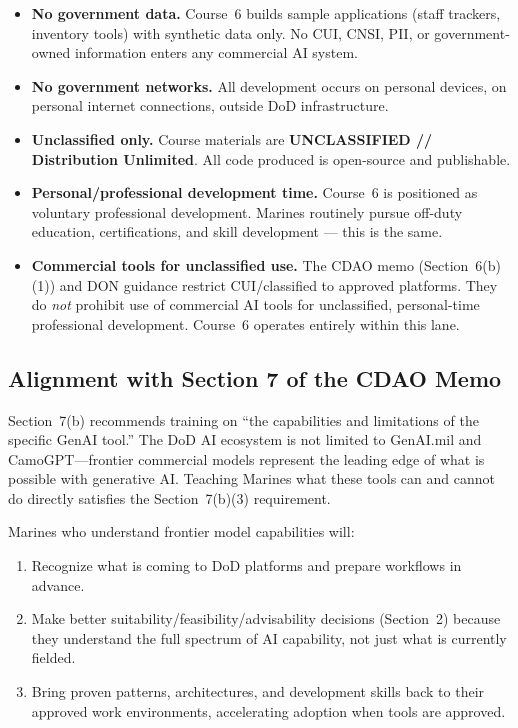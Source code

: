 \documentclass[11pt,letterpaper]{article}
\begin{document}
\begin{itemize}
  \item \textbf{No government data.} Course~6 builds sample applications (staff trackers, inventory tools) with synthetic data only.
  No CUI, CNSI, PII, or government-owned information enters any commercial AI system.
  \item \textbf{No government networks.} All development occurs on personal devices, on personal internet connections, outside DoD infrastructure.
  \item \textbf{Unclassified only.} Course materials are \textbf{UNCLASSIFIED // Distribution Unlimited}.
  All code produced is open-source and publishable.
  \item \textbf{Personal/professional development time.} Course~6 is positioned as voluntary professional development.
  Marines routinely pursue off-duty education, certifications, and skill development --- this is the same.
  \item \textbf{Commercial tools for unclassified use.} The CDAO memo (Section~6(b)(1)) and DON guidance restrict CUI/classified to approved platforms.
  They do \emph{not} prohibit use of commercial AI tools for unclassified, personal-time professional development.
  Course~6 operates entirely within this lane.
\end{itemize}

\subsection{Alignment with Section 7 of the CDAO Memo}

Section~7(b) recommends training on ``the capabilities and limitations of the specific GenAI tool.''
The DoD AI ecosystem is not limited to GenAI.mil and CamoGPT---frontier commercial models represent the leading edge of what is possible with generative AI.
Teaching Marines what these tools can and cannot do directly satisfies the Section~7(b)(3) requirement.

Marines who understand frontier model capabilities will:
\begin{enumerate}
  \item Recognize what is coming to DoD platforms and prepare workflows in advance.
  \item Make better suitability/feasibility/advisability decisions (Section~2) because they understand the full spectrum of AI capability, not just what is currently fielded.
  \item Bring proven patterns, architectures, and development skills back to their approved work environments, accelerating adoption when tools are approved.
\end{enumerate}
\end{document}
